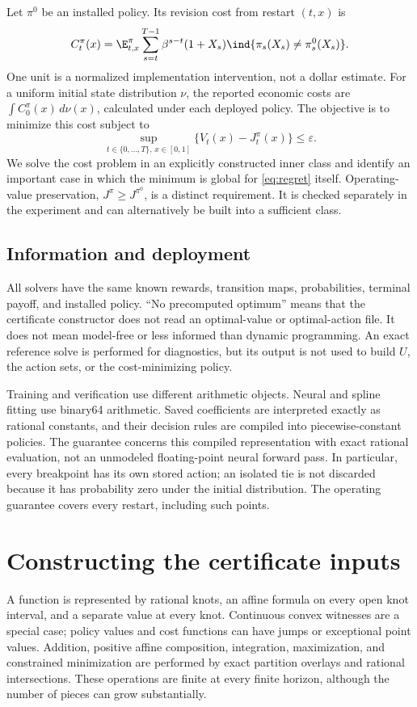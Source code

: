 Let $\pi^0$ be an installed policy. Its revision cost from restart $(t,x)$ is
\begin{equation}\label{eq:cost}
 C_t^\pi(x)=\E_{t,x}^{\pi}\sum_{s=t}^{T-1}\beta^{s-t}
 (1+X_s)\ind\{\pi_s(X_s)\ne\pi_s^0(X_s)\}.
\end{equation}
One unit is a normalized implementation intervention, not a dollar estimate. For a uniform initial state distribution $\nu$, the reported economic costs are $\int C_0^\pi(x)\,d\nu(x)$, calculated under each deployed policy. The objective is to minimize this cost subject to
\begin{equation}\label{eq:regret}
 \sup_{t\in\{0,\ldots,T\},\,x\in[0,1]}\{V_t(x)-J_t^\pi(x)\}\le\varepsilon.
\end{equation}
We solve the cost problem in an explicitly constructed inner class and identify an important case in which the minimum is global for \eqref{eq:regret} itself. Operating-value preservation, $J^\pi\ge J^{\pi^0}$, is a distinct requirement. It is checked separately in the experiment and can alternatively be built into a sufficient class.

\subsection{Information and deployment}
All solvers have the same known rewards, transition maps, probabilities, terminal payoff, and installed policy. ``No precomputed optimum'' means that the certificate constructor does not read an optimal-value or optimal-action file. It does not mean model-free or less informed than dynamic programming. An exact reference solve is performed for diagnostics, but its output is not used to build $U$, the action sets, or the cost-minimizing policy.

Training and verification use different arithmetic objects. Neural and spline fitting use binary64 arithmetic. Saved coefficients are interpreted exactly as rational constants, and their decision rules are compiled into piecewise-constant policies. The guarantee concerns this compiled representation with exact rational evaluation, not an unmodeled floating-point neural forward pass. In particular, every breakpoint has its own stored action; an isolated tie is not discarded because it has probability zero under the initial distribution. The operating guarantee covers every restart, including such points.

\section{Constructing the certificate inputs}\label{sec:construction}
A function is represented by rational knots, an affine formula on every open knot interval, and a separate value at every knot. Continuous convex witnesses are a special case; policy values and cost functions can have jumps or exceptional point values. Addition, positive affine composition, integration, maximization, and constrained minimization are performed by exact partition overlays and rational intersections. These operations are finite at every finite horizon, although the number of pieces can grow substantially.

